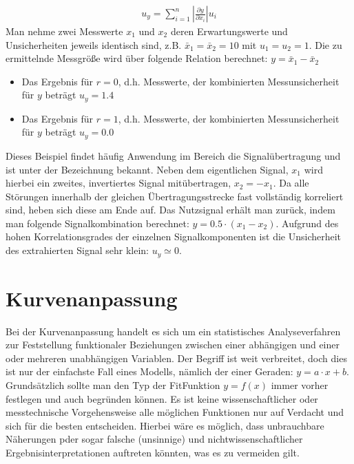\documentclass[letterpaper,10pt,english]{jupyterBook}
\begin{document}
\begin{equation*}
\begin{split}u_{y}= \displaystyle \sum_{i=1}^n
 \left| \frac{\partial y}{\partial x_i} \right| u_{i}\end{split}
\end{equation*}
\sphinxAtStartPar
{} Man nehme zwei Messwerte \(x_1\) und \(x_2\) deren Erwartungswerte und Unsicherheiten jeweils identisch sind, z.B. \(\bar x_1 = \bar x_2 = 10\) mit \(u_1 = u_2 = 1\). Die zu ermittelnde Messgröße wird über folgende Relation berechnet: \(y = \bar x_1 - \bar x_2\)
\begin{itemize}
\item {} 
\sphinxAtStartPar
Das Ergebnis für \(r = 0\), d.h.  Messwerte, der kombinierten Messunsicherheit für \(y\) beträgt \(u_y = 1.4\)

\item {} 
\sphinxAtStartPar
Das Ergebnis für \(r = 1\), d.h.  Messwerte, der kombinierten Messunsicherheit für \(y\) beträgt \(u_y = 0.0\)

\end{itemize}

\sphinxAtStartPar
Dieses Beispiel findet häufig Anwendung im Bereich die Signalübertragung und ist unter der Bezeichnung  bekannt. Neben dem eigentlichen Signal, \(x_1\) wird hierbei ein zweites, invertiertes Signal mitübertragen, \(x_2 = -x_1\). Da alle Störungen innerhalb der gleichen Übertragungsstrecke fast vollständig korreliert sind, heben sich diese am Ende auf. Das Nutzsignal erhält man zurück, indem man folgende Signalkombination berechnet: \(y = 0.5\cdot (x_1 - x_2)\). Aufgrund des hohen Korrelationsgrades der einzelnen Signalkomponenten ist die Unsicherheit des extrahierten Signal sehr klein: \(u_y \simeq 0\).

\sphinxstepscope


\section{Kurvenanpassung}
\label{\detokenize{content/1_Kurvenanpassung:kurvenanpassung}}\label{\detokenize{content/1_Kurvenanpassung::doc}}
\sphinxAtStartPar
Bei der Kurvenanpassung handelt es sich um ein statistisches Analyseverfahren zur Feststellung funktionaler Beziehungen zwischen einer abhängigen und einer oder mehreren unabhängigen Variablen. Der Begriff  ist weit verbreitet, doch dies ist nur der einfachste Fall eines Modells, nämlich der einer Geraden: \(y = a \cdot x +b\). Grundsätzlich sollte man den Typ der Fit\sphinxhyphen{}Funktion \(y = f(x)\) immer vorher festlegen und auch begründen können. Es ist keine wissenschaftlicher oder messtechnische Vorgehensweise alle möglichen Funktionen nur auf Verdacht  und sich für die besten entscheiden. Hierbei wäre es möglich, dass unbrauchbare Näherungen pder sogar falsche (unsinnige) und nicht\sphinxhyphen{}wissenschaftlicher Ergebnisinterpretationen auftreten könnten, was es zu vermeiden gilt.
\end{document}
